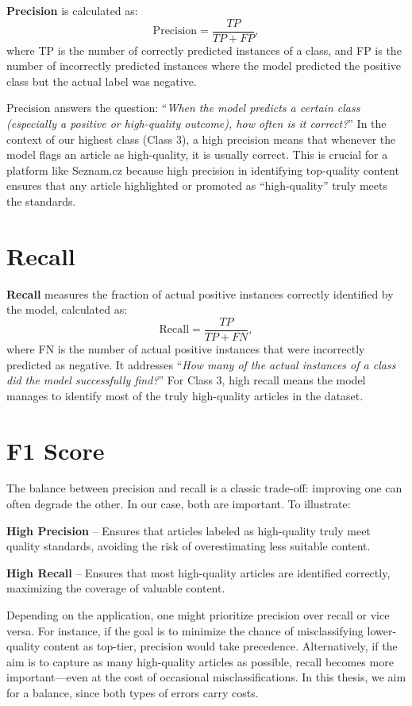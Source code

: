 \textbf{Precision} is calculated as:
\begin{equation}
\text{Precision} = \frac{TP}{TP + FP},
\end{equation}
where \ac{TP} is the number of correctly predicted instances of a class, and \ac{FP} is the number of incorrectly predicted instances where the model predicted the positive class but the actual label was negative.

Precision answers the question: “\textit{When the model predicts a certain class (especially a positive or high-quality outcome), how often is it correct?}” In the context of our highest class (\ac{Class 3}), a high precision means that whenever the model flags an article as high-quality, it is usually correct. This is crucial for a platform like Seznam.cz because high precision in identifying top-quality content ensures that any article highlighted or promoted as “high-quality” truly meets the standards.

\section{Recall}

\textbf{Recall} measures the fraction of actual positive instances correctly identified by the model, calculated as:
\begin{equation}
\text{Recall} = \frac{TP}{TP + FN},
\end{equation}
where \ac{FN} is the number of actual positive instances that were incorrectly predicted as negative. It addresses “\textit{How many of the actual instances of a class did the model successfully find?}” For \ac{Class 3}, high recall means the model manages to identify most of the truly high-quality articles in the dataset.

\section{F1 Score}
The balance between precision and recall is a classic trade-off: improving one can often degrade the other. In our case, both are important. To illustrate:

\textbf{High Precision} – Ensures that articles labeled as high-quality truly meet quality standards, avoiding the risk of overestimating less suitable content.

\textbf{High Recall} – Ensures that most high-quality articles are identified correctly, maximizing the coverage of valuable content.

Depending on the application, one might prioritize precision over recall or vice versa. For instance, if the goal is to minimize the chance of misclassifying lower-quality content as top-tier, precision would take precedence. Alternatively, if the aim is to capture as many high-quality articles as possible, recall becomes more important—even at the cost of occasional misclassifications. In this thesis, we aim for a balance, since both types of errors carry costs.

